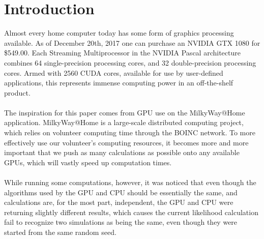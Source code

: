 \documentclass[fleqn,10pt]{SelfArx} %
\begin{document}
\flushbottom %

\maketitle %

\tableofcontents %

\thispagestyle{empty} %


\section*{Introduction} %
Almost every home computer today has some form of graphics processing available. As of December 20th, 2017 one can purchase an NVIDIA GTX 1080 for \$549.00. Each Streaming Multiprocessor in the NVIDIA Pascal architecture combines 64 single-precision processing cores, and 32 double-precision processing cores. Armed with 2560 CUDA cores, available for use by user-defined applications, this represents immense computing power in an off-the-shelf product.\\~\\
The inspiration for this paper comes from GPU use on the MilkyWay@Home application. MilkyWay@Home is a large-scale distributed computing project, which relies on volunteer computing time through the BOINC network. To more effectively use our volunteer's computing resources, it becomes more and more important that we push as many calculations as possible onto any available GPUs, which will vastly speed up computation times. \\~\\
While running some computations, however, it was noticed that even though the algorithms used by the GPU and CPU should be essentially the same, and calculations are, for the most part, independent, the GPU and CPU were returning slightly different results, which causes the current likelihood calculation fail to recognize two simulations as being the same, even though they were started from the same random seed. 
\end{document}
